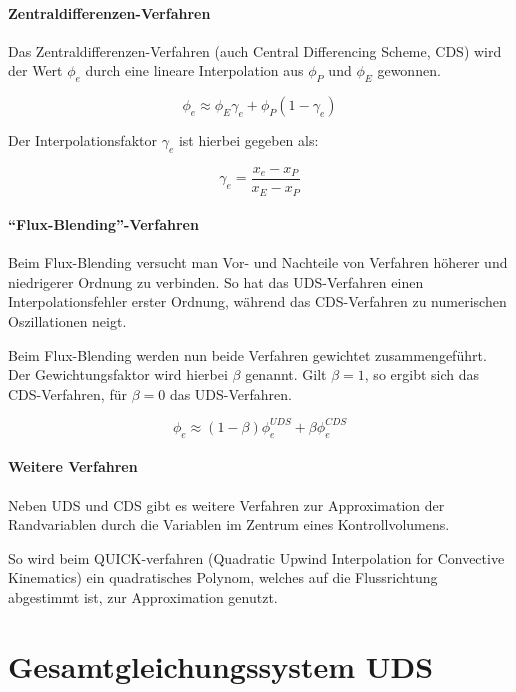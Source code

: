 \documentclass[11pt, ngerman,colorback,accentcolor=tud2d]{tudreport}
\begin{document}
\paragraph{Zentraldifferenzen-Verfahren}
Das Zentraldifferenzen-Verfahren (auch Central Differencing Scheme, CDS) wird der
Wert $\phi_e$ durch eine lineare Interpolation aus $\phi_P$ und $\phi_E$ gewonnen.

\begin{equation*}
  \phi_e \approx \phi_E\gamma_e + \phi_P (1-\gamma_e)
\end{equation*}

Der Interpolationsfaktor $\gamma_e$ ist hierbei gegeben als:

\begin{equation}
  \gamma_e = \frac{x_e-x_P}{x_E-x_P}
  \label{eq:cds_faktor}
\end{equation}

\paragraph{``Flux-Blending''-Verfahren}

Beim Flux-Blending versucht man Vor- und Nachteile von Verfahren höherer und niedrigerer
Ordnung zu verbinden. So hat das UDS-Verfahren einen Interpolationsfehler erster Ordnung,
während das CDS-Verfahren zu numerischen Oszillationen neigt.

Beim Flux-Blending werden nun beide Verfahren gewichtet zusammengeführt. Der Gewichtungsfaktor
wird hierbei $\beta$ genannt. Gilt $\beta = 1$, so ergibt sich das CDS-Verfahren, für
$\beta = 0$ das UDS-Verfahren.

\begin{equation}
  \phi_e \approx (1-\beta)\phi_e^{UDS} + \beta \phi_e^{CDS}
  \label{eq:flux_blending}
\end{equation}



\paragraph{Weitere Verfahren}
Neben UDS und CDS gibt es weitere Verfahren zur Approximation der Randvariablen durch
die Variablen im Zentrum eines Kontrollvolumens.

So wird beim QUICK-verfahren (Quadratic Upwind Interpolation for Convective
Kinematics) ein quadratisches Polynom, welches auf die Flussrichtung abgestimmt ist,
zur Approximation genutzt.

\section{Gesamtgleichungssystem UDS}
\end{document}
